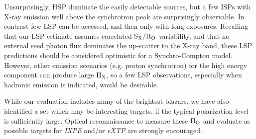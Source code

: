 Unsurprisingly, HSP dominate the easily detectable sources, but a few ISPs with X-ray emission well above the synchrotron peak are surprisingly observable. In contrast few LSP can be accessed, and then only with long exposures. Recalling that our LSP estimate assumes correlated $\rm S_X/\Pi_O$ variability, and that no external seed photon flux dominates the up-scatter to the X-ray band, these LSP predictions  should be considered optimistic for a Synchro-Compton model. However, other emission scenarios (e.g. proton synchrotron) for the high energy component can produce large $\rm \Pi_X$, so a few LSP observations, especially when hadronic emission is indicated, would be desirable.

While our evaluation includes many of the brightest blazars, we have also identified a set which may be interesting targets, if the typical polarization level is sufficiently large. Optical reconnaissance to measure these $\rm \Pi_O$ and evaluate as possible targets for {\it IXPE} and/or {\it eXTP} are strongly encouraged.

